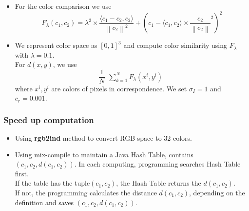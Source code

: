 \documentclass{article} %
\begin{document}
        \begin{itemize}
        \item
        For the color comparison we use 
        $$F_{\lambda}(c_{1},c_{2}) = {\lambda}^{2} \times \frac{\langle c_{1}-c_{2}, c_{2} \rangle }{ {\left \| c_{2} \right \|}^{2} } + (c_{1}-  {\langle c_{1},c_{2} \rangle} \times \frac{c_{2}}{\left \| c_{2} \right \|}^{2}    )^{2}$$
        \item
        We represent color space as $[0,1]^{3}$ and compute color similarity using $F_{\lambda}$ with $\lambda = 0.1 $.\\
        For $d(x,y)$, we use
                $$\frac{1}{N} \begin{matrix} \sum_{k=1}^N  F_{\lambda}({x^{i},y^{i}})\end{matrix}$$ where $x^{i}, y^{i}$ are colors of pixels in correspondence. We set $\sigma_{I} = 1 $ and $c_{r} = 0.001$.
                
                
          \end{itemize}      
                
        
        \subsubsection{Speed up computation}
        \begin{itemize}
        \item
        Using \textbf{rgb2ind} method to convert RGB space to 32 colors.
        
        \item
        Using mix-compile to maintain a Java Hash Table, contains $(c_{1},c_{2},d(c_{1},c_{2}))$. In each computing, programming searches  Hash Table first. \\
        If the table has the tuple$(c_{1},c_{2})$, the Hash Table returns the $d(c_{1},c_{2})$. \\
        If not, the programming calculates the distance $d(c_{1},c_{2})$, depending on the definition and saves $(c_{1},c_{2},d(c_{1},c_{2}))$.
                
        \end{itemize}
        
        
        
\end{document}
